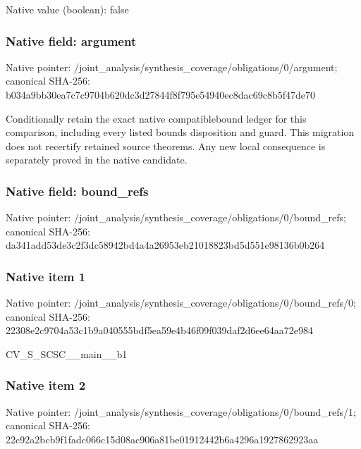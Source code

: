\documentclass[10pt,a4paper]{article}
\begin{document}
Native value (boolean): false



\subsubsection{Native field: argument}


Native pointer: /joint\_analysis/synthesi\allowbreak{}s\_coverage/obligations/0\allowbreak{}/argument; canonical SHA-256: b034a9bb30ea7c7c9704b620\allowbreak{}dc3d27844f8f795e54940ec8\allowbreak{}dac69c8b5f47de70


Conditionally retain the exact native compatiblebound ledger for this comparison, including every listed bounds disposition and guard. This migration does not recertify retained source theorems. Any new local consequence is separately proved in the native candidate.


\subsubsection{Native field: bound\_refs}


Native pointer: /joint\_analysis/synthesi\allowbreak{}s\_coverage/obligations/0\allowbreak{}/bound\_refs; canonical SHA-256: da341add53de3c2f3dc58942\allowbreak{}bd4a4a26953eb21018823bd5\allowbreak{}d551e98136b0b264



\subsubsection{Native item 1}


Native pointer: /joint\_analysis/synthesi\allowbreak{}s\_coverage/obligations/0\allowbreak{}/bound\_refs/0; canonical SHA-256: 22308e2c9704a53c1b9a0405\allowbreak{}55bdf5ea59e4b46f09f039da\allowbreak{}f2d6ee64aa72e984


CV\_S\_SCSC\_\_main\_\_b1


\subsubsection{Native item 2}


Native pointer: /joint\_analysis/synthesi\allowbreak{}s\_coverage/obligations/0\allowbreak{}/bound\_refs/1; canonical SHA-256: 22c92a2bcb9f1fadc066c15d\allowbreak{}08ac906a81be01912442b6a4\allowbreak{}296a1927862923aa
\end{document}
